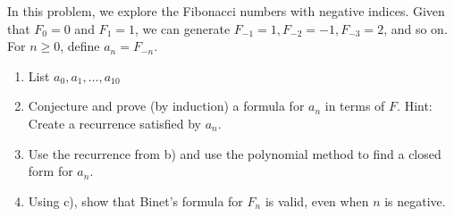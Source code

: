 \documentclass[12pt,letterpaper]{hmcpset}
\begin{document}
\begin{problem}[13]
In this problem, we explore the Fibonacci numbers with negative indices. Given that $F_0 = 0$ and $F_1 = 1$, we can generate $F_{-1} = 1, F_{-2} = -1, F_{-3} = 2$, and so on. For $n\geq 0$, define $a_n = F_{-n}$.
    \begin{enumerate}
        \item List $a_0, a_1, \ldots, a_{10}$
        \item Conjecture and prove (by induction) a formula for $a_n$ in terms of $F$. Hint: Create a recurrence satisfied by $a_n$.
        \item Use the recurrence from b) and use the polynomial method to find a closed form for $a_n$.
        \item Using c), show that Binet's formula for $F_n$ is valid, even when $n$ is negative.
    \end{enumerate}
\end{problem}
\begin{solution}
    \vfill
\end{solution}
\end{document}
